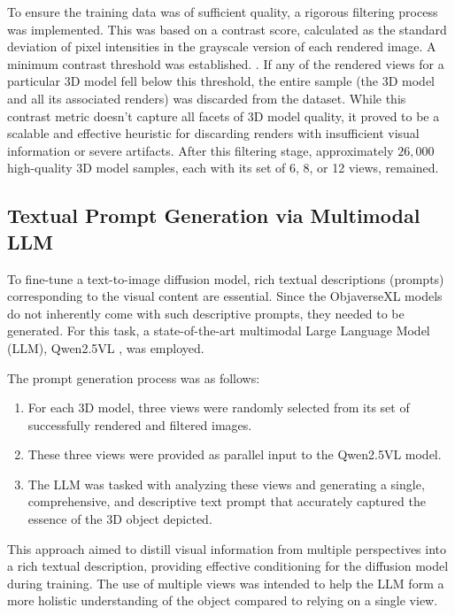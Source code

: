 To ensure the training data was of sufficient quality, a rigorous filtering process was implemented. This was based on a contrast score, calculated as the standard deviation of pixel intensities in the grayscale version of each rendered image. A minimum contrast threshold was established. . If any of the rendered views for a particular 3D model fell below this threshold, the entire sample (the 3D model and all its associated renders) was discarded from the dataset. While this contrast metric doesn't capture all facets of 3D model quality, it proved to be a scalable and effective heuristic for discarding renders with insufficient visual information or severe artifacts. After this filtering stage, approximately $26,000$ high-quality 3D model samples, each with its set of 6, 8, or 12 views, remained.

\subsection{Textual Prompt Generation via Multimodal LLM}\label{ssec:text-generation}
To fine-tune a text-to-image diffusion model, rich textual descriptions (prompts) corresponding to the visual content are essential. Since the ObjaverseXL models do not inherently come with such descriptive prompts, they needed to be generated. For this task, a state-of-the-art multimodal Large Language Model (LLM), Qwen2.5VL \cite{qwen25vl}, was employed.

The prompt generation process was as follows:
\begin{enumerate}
  \item For each 3D model, three views were randomly selected from its set of successfully rendered and filtered images.
  \item These three views were provided as parallel input to the Qwen2.5VL model.
  \item The LLM was tasked with analyzing these views and generating a single, comprehensive, and descriptive text prompt that accurately captured the essence of the 3D object depicted.
\end{enumerate}
This approach aimed to distill visual information from multiple perspectives into a rich textual description, providing effective conditioning for the diffusion model during training. The use of multiple views was intended to help the LLM form a more holistic understanding of the object compared to relying on a single view.

